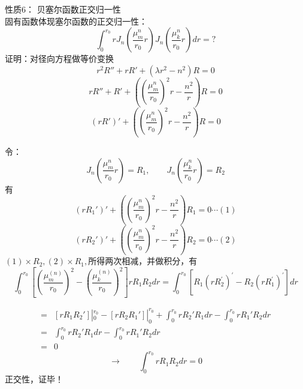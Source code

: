 	{\alert{性质6：}} 贝塞尔函数正交归一性\\
	固有函数体现塞尔函数的正交归一性：
	\begin{equation*}
		\int_0 ^{r_0} r J_n (\frac{\mu_{m} ^{n}}{r_0}r) J_n (\frac{\mu_{k} ^{n}}{r_0}r) dr =?
	\end{equation*}
	{\alert{证明：}}对径向方程做等价变换
	\begin{equation*}
		r^2 R''+r R' +(\lambda r^2 -n^2)R=0 
	\end{equation*}	
	\begin{equation*}
		r R''+ R' +((\frac{\mu_{m}^{n}}{r_0})^2 r -\frac{n^2}{r})R=0  
	\end{equation*}	
	\begin{equation*}
		(r R')' +((\frac{\mu_{m}^{n}}{r_0})^2 r -\frac{n^2}{r})R=0  
	\end{equation*}	



	令：\[J_n (\frac{\mu_{m}^{n}}{r_0}r)=R_1, \qquad J_n (\frac{\mu_{k}^{n}}{r_0}r) =R_2\]
	有
	\begin{equation*}
		(r R_1')' +((\frac{\mu_{m}^{n}}{r_0})^2 r -\frac{n^2}{r})R_1=0  \cdots (1)
	\end{equation*}	 
	\begin{equation*}
		(r R_2')' +((\frac{\mu_{m}^{n}}{r_0})^2 r -\frac{n^2}{r})R_2=0  \cdots (2) 
	\end{equation*}	
	$(1)\times R_2,  (2)\times R_1,$所得两次相减，并做积分，有
	\begin{equation*}	
		\int_0 ^{r_0} \left[\left(\frac{\mu_{m}^{(n)}}{r_0}\right)^{2}-\left(\frac{\mu_{k}^{(n)}}{r_0}\right)^{2}\right] r R_{1} R_{2} dr 
		=\int_0 ^{r_0}  [R_{1}\left(r R_{2}^{\prime}\right)^{\prime}-R_{2}\left(r R_{1}^{\prime}\right)^{\prime}] dr
	\end{equation*}



	\begin{equation*}
		\begin{split}
			=& [r R_1 R_2']|_0 ^{r_0} - [r R_2 R_1']|_0 ^{r_0} + \int_0 ^{r_0} r R_2' R_1 dr - \int_0 ^{r_0} rR_1' R_2 dr\\
			=& \int_0 ^{r_0} rR_2'R_1 dr - \int_0 ^{r_0} rR_1'R_2 dr\\
			=& 0
		\end{split}
	\end{equation*}	
	\begin{equation*}	
		\to \qquad	\int_0 ^{r_0} r R_{1} R_{2} dr = 0
	\end{equation*}
	正交性，{\alert{证毕！}}



